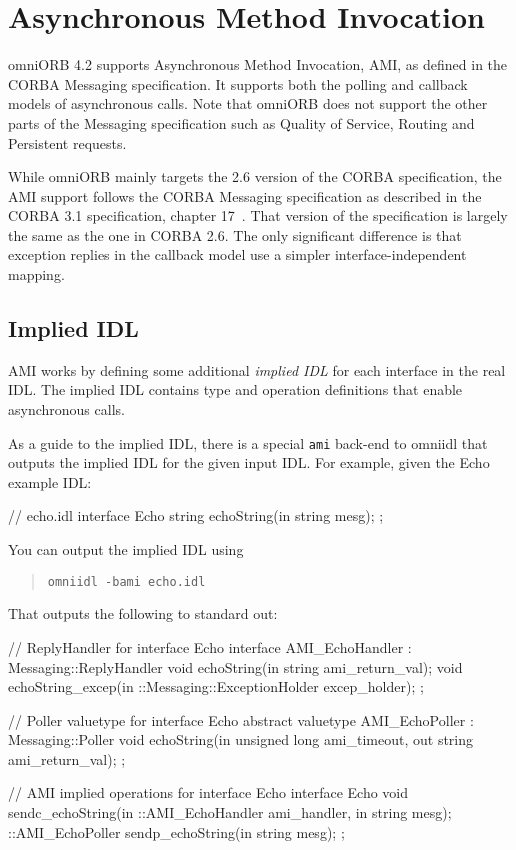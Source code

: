 \documentclass[11pt,oneside,a4paper]{book}
\newcommand{\cmdline}[1]{\texttt{#1}}
\newcommand{\term}[1]{\textit{#1}}
\begin{document}
\chapter{Asynchronous Method Invocation}
\label{chap:ami}

omniORB 4.2 supports Asynchronous Method Invocation, AMI, as defined
in the CORBA Messaging specification. It supports both the polling and
callback models of asynchronous calls. Note that omniORB does not
support the other parts of the Messaging specification such as Quality
of Service, Routing and Persistent requests.

While omniORB mainly targets the 2.6 version of the CORBA
specification, the AMI support follows the CORBA Messaging
specification as described in the CORBA 3.1 specification, chapter
17~\cite{corba31-spec}. That version of the specification is largely
the same as the one in CORBA 2.6. The only significant difference is
that exception replies in the callback model use a simpler
interface-independent mapping.

\section{Implied IDL}

AMI works by defining some additional \term{implied IDL} for each
interface in the real IDL. The implied IDL contains type and
operation definitions that enable asynchronous calls.

As a guide to the implied IDL, there is a special \cmdline{ami}
back-end to omniidl that outputs the implied IDL for the given input
IDL. For example, given the Echo example IDL:

\begin{idllisting}
// echo.idl
interface Echo {
  string echoString(in string mesg);
};
\end{idllisting}

\noindent You can output the implied IDL using

\begin{quote}
\cmdline{omniidl -bami echo.idl}
\end{quote}

\noindent That outputs the following to standard out:

\begin{idllisting}
// ReplyHandler for interface Echo
interface AMI_EchoHandler : Messaging::ReplyHandler {
  void echoString(in string ami_return_val);
  void echoString_excep(in ::Messaging::ExceptionHolder excep_holder);
};

// Poller valuetype for interface Echo
abstract valuetype AMI_EchoPoller : Messaging::Poller {
  void echoString(in unsigned long ami_timeout, out string ami_return_val);
};

// AMI implied operations for interface Echo
interface Echo {
  void sendc_echoString(in ::AMI_EchoHandler ami_handler, in string mesg);
  ::AMI_EchoPoller sendp_echoString(in string mesg);
};
\end{idllisting}
\end{document}
